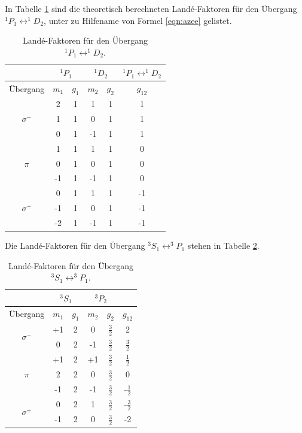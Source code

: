 In Tabelle \ref{tab:Lande_rot} sind die theoretisch berechneten Landé-Faktoren für den Übergang $^1P_1 \leftrightarrow ^1\!\!D_2$,
unter zu Hilfename von Formel \eqref{eqn:azee} gelistet.
\begin{table}
	\centering
  \caption{Landé-Faktoren für den Übergang $^1P_1 \leftrightarrow ^1\!\!D_2$.}
	\label{tab:Lande_rot}
	\begin{tabular}{cccccc}
		\toprule
		{} & \multicolumn{2}{c}{${}^1P_1$}  & \multicolumn{2}{c}{${}^1D_2$}  & $^1P_1 \leftrightarrow ^1\!\!D_2$ \\
		\midrule
		 Übergang &   $m_1$  & $g_{1}$ & $m_2$ & $ g_2$  & $g_{12}$  \\
		\midrule
		& 2 & 1 & 1 & 1 & 1\\
		$\sigma^-$ & 1 & 1 & 0 & 1 & 1\\
		& 0 & 1 & -1 & 1 & 1\\
		\midrule
		& 1 & 1 & 1 & 1 & 0\\
		$\pi$ & 0 & 1 & 0 & 1 & 0\\
		& -1 & 1 & -1 & 1 & 0\\
		\midrule
		& 0 & 1 & 1 & 1 & -1\\
		$\sigma^+$ & -1 & 1 & 0 & 1 & -1\\
		& -2 & 1 & -1 & 1 & -1\\\bottomrule
	\end{tabular}
  \end{table}
  Die Landé-Faktoren für den Übergang $^3S_1\leftrightarrow ^3\!\!P_1$ stehen in Tabelle \ref{tab:Lande_blau}.

  \begin{table}
  \caption{Landé-Faktoren für den Übergang $^3S_1\leftrightarrow ^3\!\!P_1$.} %
	\label{tab:Lande_blau}
	\centering
  \renewcommand{\arraystretch}{1.2}
  \begin{tabular}{cccccc}
		\toprule
    & \multicolumn{2}{c}{${}^3S_1$}  & \multicolumn{2}{c}{${}^3P_2$} \\
		\midrule
    Übergang & $m_1$  & $g_{1}$ & $m_2$ & $ g_2$ & $g_{12}$\\
		\midrule
		\multirow{2}{*}{$\sigma^-$} & +1 & 2 & 0 & $\frac{3}{2}$& 2\\
		& 0 & 2 & -1 & $\frac{3}{2}$ & $\frac{3}{2}$\\
		\midrule
		& +1 & 2 & +1 & $\frac{3}{2}$ & $\frac{1}{2}$\\
		$\pi$ & 2 & 2 & 0 & $\frac{3}{2}$ & 0 \\
		& -1 & 2 & -1 & $\frac{3}{2}$ & -$\frac{1}{2}$\\
		\midrule
		\multirow{2}{*}{$\sigma^+$} & 0 & 2 & 1 & $\frac{3}{2}$ & -$\frac{3}{2}$\\
		& -1 & 2 & 0 & $\frac{3}{2}$& -2\\
		\bottomrule
	\end{tabular}
\end{table}
\FloatBarrier

